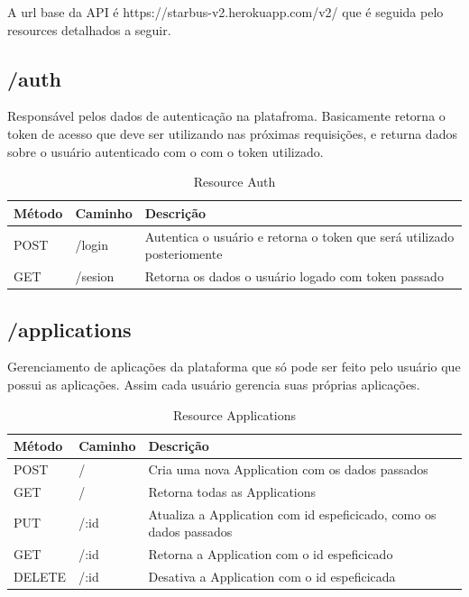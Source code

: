 A url base da API é https://starbus-v2.herokuapp.com/v2/ que é seguida pelo resources detalhados a seguir.

\subsection{/auth}

Responsável pelos dados de autenticação na platafroma. Basicamente retorna o token de acesso que
deve ser utilizando nas próximas requisições, e returna dados sobre o usuário autenticado com o 
com o token utilizado. 

\begin{table}[htbp]
	\scriptsize
	\centering
	\begin{tabular}{|l|l|l|}
		\hline \textbf{Método} & \textbf{Caminho} & \textbf{Descrição} \\ 
    \hline POST   & /login    & Autentica o usuário e retorna o token que será utilizado posteriomente \\
    \hline GET   & /sesion    & Retorna os dados o usuário logado com token passado \\
		\hline 
	\end{tabular}
	\caption{Resource Auth}
	\label{tab:resources}
\end{table}


\subsection{/applications}

Gerenciamento de aplicações da plataforma que só pode ser feito pelo usuário que possui as aplicações. Assim 
cada usuário gerencia suas próprias aplicações. 

\begin{table}[htbp]
	\scriptsize
	\centering
	\begin{tabular}{|l|l|l|}
		\hline \textbf{Método} & \textbf{Caminho} & \textbf{Descrição} \\ 
    \hline POST   & /    & Cria uma nova Application com os dados passados \\
		\hline GET    & /    & Retorna todas as Applications \\
		\hline PUT    & /:id & Atualiza a Application com id espeficicado, como os dados passados \\
		\hline GET    & /:id & Retorna a Application com o id espeficicado \\
		\hline DELETE & /:id & Desativa a Application com o id espeficicada \\
		\hline 
	\end{tabular}
	\caption{Resource Applications}
	\label{tab:resources}
\end{table}

